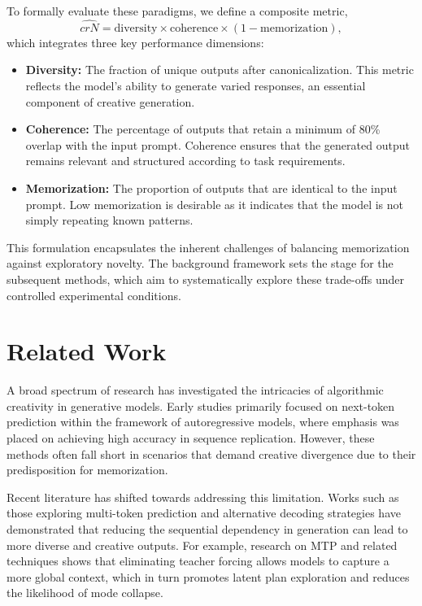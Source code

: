 \documentclass[12pt]{article}
\begin{document}
To formally evaluate these paradigms, we define a composite metric,
\[
\hat{crN} = \text{diversity} \times \text{coherence} \times (1-\text{memorization}),
\]
which integrates three key performance dimensions:
\begin{itemize}
    \item \textbf{Diversity:} The fraction of unique outputs after canonicalization. This metric reflects the model's ability to generate varied responses, an essential component of creative generation.
    \item \textbf{Coherence:} The percentage of outputs that retain a minimum of 80\% overlap with the input prompt. Coherence ensures that the generated output remains relevant and structured according to task requirements.
    \item \textbf{Memorization:} The proportion of outputs that are identical to the input prompt. Low memorization is desirable as it indicates that the model is not simply repeating known patterns.
\end{itemize}

This formulation encapsulates the inherent challenges of balancing memorization against exploratory novelty. The background framework sets the stage for the subsequent methods, which aim to systematically explore these trade-offs under controlled experimental conditions.

\section{Related Work}
A broad spectrum of research has investigated the intricacies of algorithmic creativity in generative models. Early studies primarily focused on next-token prediction within the framework of autoregressive models, where emphasis was placed on achieving high accuracy in sequence replication. However, these methods often fall short in scenarios that demand creative divergence due to their predisposition for memorization.

Recent literature has shifted towards addressing this limitation. Works such as those exploring multi-token prediction and alternative decoding strategies have demonstrated that reducing the sequential dependency in generation can lead to more diverse and creative outputs. For example, research on MTP and related techniques shows that eliminating teacher forcing allows models to capture a more global context, which in turn promotes latent plan exploration and reduces the likelihood of mode collapse.
\end{document}
